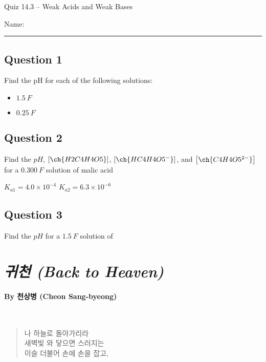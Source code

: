 \documentclass[11pt, letterpaper]{memoir}
\begin{document}
	\begin{center}
		{\large	Quiz 14.3 -- Weak Acids and Weak Bases}
	\end{center}
	{\large Name: \rule[-1mm]{4in}{.1pt} 
	
	
	\subsection*{Question 1}
	Find the pH for each of the following solutions:
	\begin{itemize}
		\item $1.5~F$ 
		
		\vspace{6em}
		\item $0.25~F$ 		
	\end{itemize}
	
	\vspace{6em}
	\subsection*{Question 2}
	Find the $pH$, $\left[\ch{H2C4H4O5}\right]$, $\left[\ch{HC4H4O5^-}\right]$, and  $\left[\ch{C4H4O5^{2-}}\right]$ for a $0.300~F$ solution of malic acid

  \noindent
  $K_{a1}=4.0\times10^{-4}$ \hspace{4em} $K_{a2}=6.3\times10^{-6}$
	
	\vspace{14em}
	\subsection*{Question 3}
	Find the $pH$ for a $1.5~F$ solution of 
	\newpage
	\pagestyle{empty}
	\addtocounter{page}{-1}
	\section*{\emph{{귀천} (Back to Heaven)}}
	\paragraph{By {천상병} (Cheon Sang-byeong)}~
	
	{
		\begin{verse}
			나 하늘로 돌아가리라\\
			새벽빛 와 닿으면 스러지는\\
			이슬 더불어 손에 손을 잡고,
			

\end{verse}}}
\end{document}
